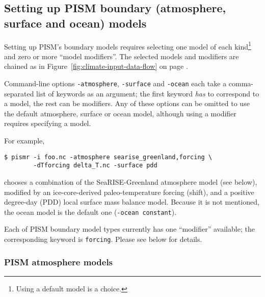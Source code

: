 \subsection{Setting up PISM boundary (atmosphere, surface and ocean) models}
\label{sec:boundary-models}

Setting up PISM's boundary models requires selecting one model of each kind\footnote{Using a default model is a choice.} and zero or more ``model modifiers''.  The selected models and modifiers are chained as in Figure~\ref{fig:climate-input-data-flow} on page \pageref{fig:climate-input-data-flow}.

Command-line options \texttt{-atmosphere}, \texttt{-surface} and \texttt{-ocean} each take a comma-separated list of keywords as an argument; the first keyword \emph{has} to correspond to a model, the rest can be modifiers. Any of these options can be omitted to use the default atmosphere, surface or ocean model, although using a modifier requires specifying a model.

For example,
\begin{verbatim}
$ pismr -i foo.nc -atmosphere searise_greenland,forcing \
        -dTforcing delta_T.nc -surface pdd
\end{verbatim}%
chooses a combination of the SeaRISE-Greenland atmosphere model (see below), modified by an ice-core-derived paleo-temperature forcing (shift), and a positive degree-day (PDD) local surface mass balance model.  Because it is not mentioned, the ocean model is the default one (\texttt{-ocean constant}).

Each of PISM boundary model types currently has one ``modifier'' available; the corresponding keyword is \texttt{forcing}. Please see below for details.

\subsubsection{PISM atmosphere models}
\label{sec:pism-atmosphere}

